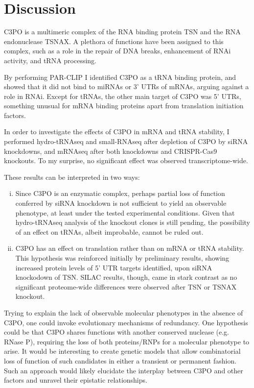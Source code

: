 \documentclass[12pt]{rockefeller}
\begin{document}
\chapter{Discussion}

C3PO is a multimeric complex of the RNA binding protein TSN and the RNA endonuclease TSNAX. A plethora of functions have been assigned to this complex, such as a role in the repair of DNA breaks, enhancement of RNAi activity, and tRNA processing.

By performing PAR-CLIP I identified C3PO as a tRNA binding protein, and showed that it did not bind to miRNAs or 3’ UTRs of mRNAs, arguing against a role in RNAi. Except for tRNAs, the other main target of C3PO was 5’ UTRs, something unusual for mRNA binding proteins apart from translation initiation factors. 

In order to investigate the effects of C3PO in mRNA and tRNA stability, I performed hydro-tRNAseq and small-RNAseq after depletion of C3PO by siRNA knockdowns, and mRNAseq after both knockdowns and CRISPR-Cas9 knockouts. To my surprise, no significant effect was observed transcriptome-wide.

These results can be interpreted in two ways:
\begin{enumerate}[i)]
\item Since C3PO is an enzymatic complex, perhaps partial loss of function conferred by siRNA knockdown is not sufficient to yield an observable phenotype, at least under the tested experimental conditions. Given that hydro-tRNAseq analysis of the knockout clones is still pending, the possibility of an effect on tRNAs, albeit improbable, cannot be ruled out. 
\item C3PO has an effect on translation rather than on mRNA or tRNA stability. This hypothesis was reinforced initially by preliminary results, showing increased protein levels of 5' UTR targets identified, upon siRNA knockodown of TSN. SILAC results, though, came in stark contrast as no significant proteome-wide differences were observed after TSN or TSNAX knockout. 
\end{enumerate}

Trying to explain the lack of observable molecular phenotypes in the absence of C3PO, one could invoke evolutionary mechanisms of redundancy. One hypothesis could be that C3PO shares functions with another conserved nuclease (e.g. RNase P), requiring the loss of both proteins/RNPs for a molecular phenotype to arise. It would be interesting to create genetic models that allow combinatorial loss of function of such candidates in either a transient or permanent fashion. Such an approach would likely elucidate the interplay between C3PO and other factors and unravel their epistatic relationships.
\end{document}
